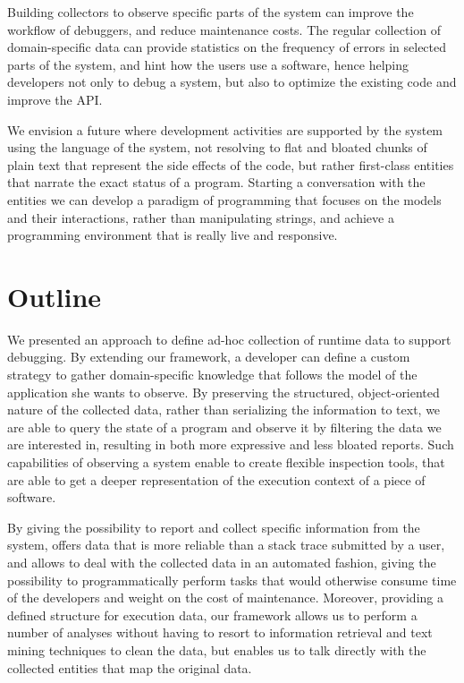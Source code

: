 Building collectors to observe specific parts of the system can improve the workflow of debuggers, and reduce maintenance costs.
The regular collection of domain-specific data can provide statistics on the frequency of errors in selected parts of the system, and hint how the users use a software, hence helping developers not only to debug a system, but also to optimize the existing code and improve the API.

We envision a future where development activities are supported by the system using the language of the system, not resolving to flat and bloated chunks of plain text that represent the side effects of the code, but rather first-class entities that narrate the exact status of a program.
Starting a conversation with the entities we can develop a paradigm of programming that focuses on the models and their interactions, rather than manipulating strings, and achieve a programming environment that is really live and responsive.


\section{Outline}\label{sec:reified-summary}

We presented an approach to define ad-hoc collection of runtime data to support debugging.
By extending our framework, a developer can define a custom strategy to gather domain-specific knowledge that follows the model of the application she wants to observe.
By preserving the structured, object-oriented nature of the collected data, rather than serializing the information to text, we are able to query the state of a program  and observe it by filtering the data we are interested in, resulting in both more expressive and less bloated reports.
Such capabilities of observing a system enable to create flexible inspection tools, that are able to get a deeper representation of the execution context of a piece of software.

By giving the possibility to report and collect specific information from the system, \sln offers data that is more reliable than a stack trace submitted by a user, and allows to deal with the collected data in an automated fashion, giving the possibility to programmatically perform tasks that would otherwise consume time of the developers and weight on the cost of maintenance.
Moreover, providing a defined structure for execution data, our framework allows us to perform a number of analyses without having to resort to information retrieval and text mining techniques to clean the data, but enables us to talk directly with the collected entities that map the original data.

